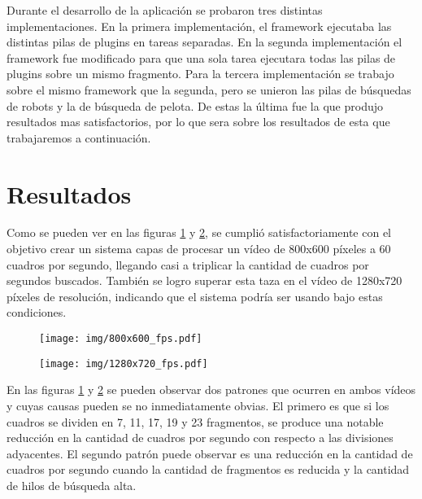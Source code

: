 Durante el desarrollo de la aplicación se probaron tres distintas
implementaciones. En la primera implementación, el framework ejecutaba las
distintas pilas de plugins en tareas separadas. En la segunda implementación el
framework fue modificado para que una sola tarea ejecutara todas las pilas de
plugins sobre un mismo fragmento. Para la tercera implementación se trabajo
sobre el mismo framework que la segunda, pero se unieron las pilas de búsquedas
de robots y la de búsqueda de pelota. De estas la última fue la que produjo
resultados mas satisfactorios, por lo que sera sobre los resultados de esta que
trabajaremos a continuación.

\section{Resultados}

Como se pueden ver en las figuras \ref{800fps} y \ref{1280fps}, se cumplió
satisfactoriamente con el objetivo crear un sistema capas de procesar un vídeo
de 800x600 píxeles a 60 cuadros por segundo, llegando casi a triplicar la
cantidad de cuadros por segundos buscados. También se logro superar esta taza en
el vídeo de 1280x720 píxeles de resolución, indicando que el sistema podría ser
usando bajo estas condiciones.

\begin{figure}[!h]

	\texttt{[image: img/800x600\_fps.pdf]}
	\caption{}
	\label{800fps}

\end{figure}

\begin{figure}[!h]

	\texttt{[image: img/1280x720\_fps.pdf]}
	\caption{}
	\label{1280fps}

\end{figure}

En las figuras \ref{800fps} y \ref{1280fps} se pueden observar dos patrones que
ocurren en ambos vídeos y cuyas causas pueden se no inmediatamente obvias. El
primero es que si los cuadros se dividen en 7, 11, 17, 19 y 23 fragmentos, se
produce una notable reducción en la cantidad de cuadros por segundo con respecto
a las divisiones adyacentes. El segundo patrón puede observar es una reducción
en la cantidad de cuadros por segundo cuando la cantidad de fragmentos es
reducida y la cantidad de hilos de búsqueda alta.

